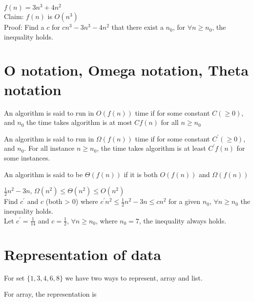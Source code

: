 			\begin{example}
				$f(n) = 3n^3 + 4n^2$\\
				Claim: $f(n)$ is $O(n^3)$\\
				Proof: Find a $c$ for $cn^3 - 3n^3 - 4n^2$ that there exist a $n_0$, for $\forall n \ge n_0$, the inequality holds.
			\end{example}

		\section{O notation, Omega notation, Theta notation}
			\begin{definition}[O notation]
				An algorithm is said to run in $O(f(n))$ time if for some constant $C (\ge 0)$, and $n_0$ the time takes algorithm is at most $Cf(n)$ for all $n\ge n_0$ 
			\end{definition}

			\begin{definition}
				An algorithm is said to run in $\Omega(f(n))$ time if for some constant $C^{'} (\ge 0)$, and $n_0$. For all instance $n \ge n_0$, the time takes algorithm is at least $C^{'}f(n)$ for some instances. 
			\end{definition}

			\begin{definition}
				An algorithm is said to be $\Theta(f(n))$ if it is both $O(f(n))$ and $\Omega(f(n))$
			\end{definition}

			\begin{example}
				$\frac{1}{2}n^2 - 3n$, $\Omega(n^2) \le \Theta(n^2) \le O(n^2)$\\
				Find $c^{'}$ and $c$ (both > 0) where $c^{'}n^2 \le \frac{1}{2}n^2 - 3n \le cn^2$ for a given $n_0$, $\forall n\ge n_0$ the inequality holds.\\
				Let $c^{'} = \frac{1}{14}$ and $c = \frac{1}{2}$, $\forall n \ge n_0$, where $n_0 = 7$, the inequality always holds.
			\end{example}

		\section{Representation of data}
			For set $\{1, 3, 4, 6, 8\}$ we have two ways to represent, array and list.

			For array, the representation is
			\begin{figure}[!ht]
				\centering
			\end{figure}

